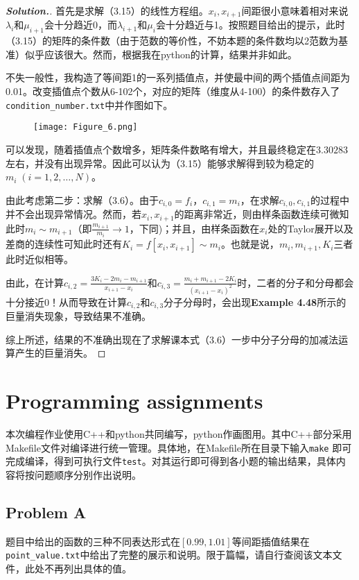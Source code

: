 \documentclass{ctexart}
\begin{document}
\begin{sloppypar}
\begin{proof}[\textbf{Solution.}]
首先是求解（3.15）的线性方程组。$x_i,x_{i+1}$间距很小意味着相对来说$\lambda_i$和$\mu_{i+1}$会十分趋近0，而$\lambda_{i+1}$和$\mu_{i}$会十分趋近与1。按照题目给出的提示，此时（3.15）的矩阵的条件数（由于范数的等价性，不妨本题的条件数均以2范数为基准）似乎应该很大。然而，根据我在python的计算，结果并非如此。

不失一般性，我构造了等间距1的一系列插值点，并使最中间的两个插值点间距为0.01。改变插值点个数从6-102个，对应的矩阵（维度从4-100）的条件数存入了\verb|condition_number.txt|中并作图如下。
\begin{figure}[H]
\centering
\texttt{[image: Figure\_6.png]}
\label{Fig1}
\end{figure}
可以发现，随着插值点个数增多，矩阵条件数略有增大，并且最终稳定在$3.30283$左右，并没有出现异常。因此可以认为（3.15）能够求解得到较为稳定的$m_i\;(i=1,2,\dots,N)$。

由此考虑第二步：求解（3.6）。由于$c_{i,0}=f_i$，$c_{i,1}=m_i$，在求解$c_{i,0},c_{i,1}$的过程中并不会出现异常情况。然而，若$x_i,x_{i+1}$的距离非常近，则由样条函数连续可微知此时$m_i \sim m_{i+1}$（即$\frac{m_{i+1}}{m_i} \rightarrow 1$，下同)；并且，由样条函数在$x_i$处的Taylor展开以及差商的连续性可知此时还有$K_i = f[x_i,x_{i+1}] \sim m_i$。也就是说，$m_i,m_{i+1},K_i$三者此时近似相等。

由此，在计算$c_{i,2}=\frac{3K_i-2m_i-m_{i+1}}{x_{i+1}-x_i}$和$c_{i,3}=\frac{m_i+m_{i+1}-2K_i}{(x_{i+1}-x_i)^2}$时，二者的分子和分母都会十分接近0！从而导致在计算$c_{i,2}$和$c_{i,3}$分子分母时，会出现\textbf{Example 4.48}所示的巨量消失现象，导致结果不准确。

综上所述，结果的不准确出现在了求解课本式（3.6）一步中分子分母的加减法运算产生的巨量消失。
\end{proof}

\section*{Programming assignments}
本次编程作业使用C++和python共同编写，python作画图用。其中C++部分采用Makefile文件对编译进行统一管理。具体地，在Makefile所在目录下输入\verb|make|
即可完成编译，得到可执行文件\verb|test|。对其运行即可得到各小题的输出结果，具体内容将按问题顺序分别作出说明。
\subsection*{Problem A}
题目中给出的函数的三种不同表达形式在$[0.99,1.01]$等间距插值结果在\verb|point_value.txt|中给出了完整的展示和说明。限于篇幅，请自行查阅该文本文件，此处不再列出具体的值。


\end{sloppypar}
\end{document}
